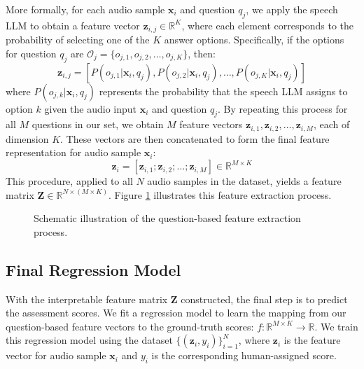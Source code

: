 \documentclass{report}
\begin{document}
More formally, for each audio sample $\mathbf{x}_i$ and question $q_j$, we apply the speech LLM to obtain a feature vector $\mathbf{z}_{i,j} \in \mathbb{R}^K$, where each element corresponds to the probability of selecting one of the $K$ answer options. Specifically, if the options for question $q_j$ are $\mathcal{O}_j = \{o_{j,1}, o_{j,2}, \ldots, o_{j,K}\}$, then:
$$\mathbf{z}_{i,j} = [P(o_{j,1} | \mathbf{x}_i, q_j), P(o_{j,2} | \mathbf{x}_i, q_j), \ldots, P(o_{j,K} | \mathbf{x}_i, q_j)]$$
where $P(o_{j,k} | \mathbf{x}_i, q_j)$ represents the probability that the speech LLM assigns to option $k$ given the audio input $\mathbf{x}_i$ and question $q_j$. By repeating this process for all $M$ questions in our set, we obtain $M$ feature vectors $\mathbf{z}_{i,1}, \mathbf{z}_{i,2}, \ldots, \mathbf{z}_{i,M}$, each of dimension $K$. These vectors are then concatenated to form the final feature representation for audio sample $\mathbf{x}_i$:
$$\mathbf{z}_i = [\mathbf{z}_{i,1}; \mathbf{z}_{i,2}; \ldots; \mathbf{z}_{i,M}] \in \mathbb{R}^{M \times K}$$
This procedure, applied to all $N$ audio samples in the dataset, yields a feature matrix $\mathbf{Z} \in \mathbb{R}^{N \times (M \times K)}$. Figure \ref{fig:question_based_approach} illustrates this feature extraction process.
\begin{figure}[h]
  \centering
  \caption{Schematic illustration of the question-based feature extraction process.}
  \label{fig:question_based_approach}
\end{figure}

\subsection{Final Regression Model}
\label{subsec:final_regression_model}
With the interpretable feature matrix $\mathbf{Z}$ constructed, the final step is to predict the assessment scores. We fit a regression model to learn the mapping from our question-based feature vectors to the ground-truth scores: $f: \mathbb{R}^{M \times K} \to \mathbb{R}$. We train this regression model using the dataset $\{(\mathbf{z}_i, y_i)\}_{i=1}^N$, where $\mathbf{z}_i$ is the feature vector for audio sample $\mathbf{x}_i$ and $y_i$ is the corresponding human-assigned score.
\end{document}

